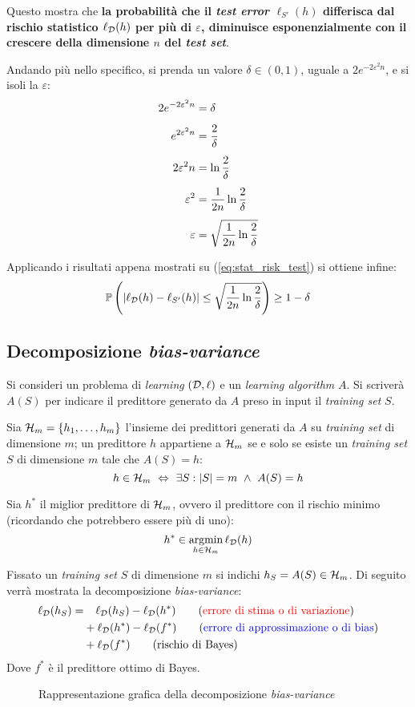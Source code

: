 Questo mostra che \textbf{la probabilità che il \textit{test error} 
$\ell_{S'}(h)$ differisca dal rischio statistico $\ell_{\mathcal{D}}(h)$ per più di 
$\varepsilon$, diminuisce esponenzialmente con il crescere della dimensione $n$ 
del \textit{test set}}.

Andando più nello specifico, si prenda un valore $\delta\in (0,1)$, uguale a
$2e^{-2\varepsilon^2n}$, e si isoli la $\varepsilon$:
\begin{align}
    2e^{-2\varepsilon^2n} &= \delta\notag\\[.15cm]
    e^{2\varepsilon^2n} &= \frac{2}{\delta}\notag\\[.15cm]
    2\varepsilon^2n &= \ln{\frac{2}{\delta}}\notag\\[.15cm]
    \varepsilon^2 &= \frac{1}{2n}\ln{\frac{2}{\delta}}\notag\\[.15cm]
    \varepsilon &= \sqrt{\frac{1}{2n}\ln{\frac{2}{\delta}}}\notag
\end{align}

Applicando i risultati appena mostrati su (\ref{eq:stat_risk_test}) si ottiene
infine:
$$ \mathbb{P}\left(|\ell_{\mathcal{D}}(h)-\ell_{S'}(h)| \leq 
\sqrt{\frac{1}{2n}\ln{\frac{2}{\delta}}}\right) \geq
1-\delta $$

\subsection{Decomposizione \textit{bias-variance}}
Si consideri un problema di \textit{learning} $(\mathcal{D},\ell)$ e un \textit{learning
algorithm} $A$. Si scriverà $A(S)$ per indicare il predittore generato da $A$
preso in input il \textit{training set} $S$.

Sia $\mathcal{H}_m = \{h_1,\dots,h_m\}$ l'insieme dei predittori generati da $A$ su 
\textit{training set} di dimensione $m$; un predittore $h$ appartiene a $\mathcal{H}_m$ se
e solo se esiste un \textit{training set} $S$ di dimensione $m$ tale che $A(S)=h$:
$$ h\in\mathcal{H}_m \ \Leftrightarrow \ \exists S : |S|=m \ \wedge \ A(S)=h $$

Sia $h^*$ il miglior predittore di $\mathcal{H}_m$, ovvero il predittore con il rischio minimo
(ricordando che potrebbero essere più di uno):
$$ h^* \in \operatorname*{argmin}_{h\in\mathcal{H}_m} \ell_{\mathcal{D}}(h) $$

Fissato un \textit{training set} $S$ di dimensione $m$ si indichi
$ h_S = A(S) \in \mathcal{H}_m $. Di seguito verrà mostrata la decomposizione
\textit{bias-variance}:
\begin{align}
    \ell_\D(h_S) =& \phantom{+.} \ell_\D(h_S) - \ell_\D(h^*)
    \tag{{\color{red}errore di stima o di variazione}}\\ 
        & +\ell_\D(h^*) - \ell_\D(f^*)
            \tag{{\color{blue}errore di approssimazione o di bias}}\\
        & +\ell_\D(f^*) \tag{rischio di Bayes}
\end{align}
Dove $f^*$ è il predittore ottimo di Bayes.
\begin{figure}[h]
    \centering
    
    \caption{Rappresentazione grafica della decomposizione \textit{bias-variance}}
\end{figure}

